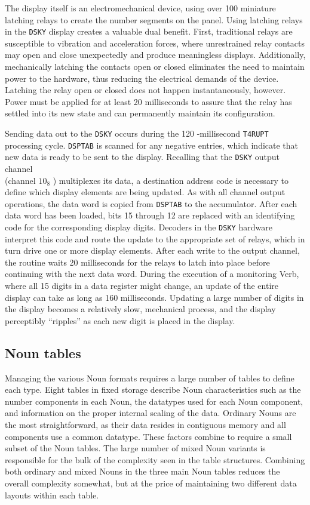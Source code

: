 \documentclass[refcap, oxford]{ahsan}
\begin{document}
The display itself is an electromechanical device, using over 100 miniature latching relays to create the number segments on the panel. Using latching relays in the \texttt{DSKY} display creates a valuable dual benefit. First, traditional relays are susceptible to vibration and acceleration forces, where unrestrained relay contacts may open and close unexpectedly and produce meaningless displays. Additionally, mechanically latching the contacts open or closed eliminates the need to maintain power to the hardware, thus reducing the electrical demands of the device. Latching the relay open or closed does not happen instantaneously, however. Power must be applied for at least 20 milliseconds to assure that the relay has settled into its new state and can permanently maintain its configuration.

Sending data out to the \texttt{DSKY} occurs during the 120 -millisecond \texttt{T4RUPT} processing cycle. \texttt{DSPTAB} is scanned for any negative entries, which indicate that new data is ready to be sent to the display. Recalling that the \texttt{DSKY} output channel\\
(channel $10_{8}$ ) multiplexes its data, a destination address code is necessary to define which display elements are being updated. As with all channel output operations, the data word is copied from \texttt{DSPTAB} to the accumulator. After each data word has been loaded, bits 15 through 12 are replaced with an identifying code for the corresponding display digits. Decoders in the \texttt{DSKY} hardware interpret this code and route the update to the appropriate set of relays, which in turn drive one or more display elements. After each write to the output channel, the routine waits 20 milliseconds for the relays to latch into place before continuing with the next data word. During the execution of a monitoring Verb, where all 15 digits in a data register might change, an update of the entire display can take as long as 160 milliseconds. Updating a large number of digits in the display becomes a relatively slow, mechanical process, and the display perceptibly ``ripples'' as each new digit is placed in the display.


\subsection{Noun tables}
Managing the various Noun formats requires a large number of tables to define each type. Eight tables in fixed storage describe Noun characteristics such as the number components in each Noun, the datatypes used for each Noun component, and information on the proper internal scaling of the data. Ordinary Nouns are the most straightforward, as their data resides in contiguous memory and all components use a common datatype. These factors combine to require a small subset of the Noun tables. The large number of mixed Noun variants is responsible for the bulk of the complexity seen in the table structures. Combining both ordinary and mixed Nouns in the three main Noun tables reduces the overall complexity somewhat, but at the price of maintaining two different data layouts within each table.
\end{document}
